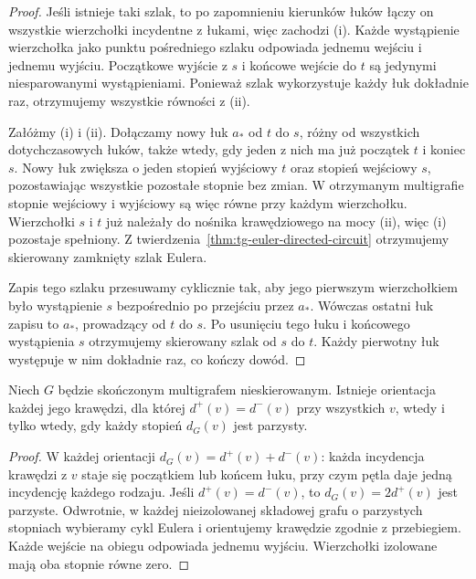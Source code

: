 \begin{proof}
Jeśli istnieje taki szlak, to po zapomnieniu kierunków
łuków łączy on wszystkie wierzchołki incydentne z łukami,
więc zachodzi (i). Każde wystąpienie wierzchołka jako
punktu pośredniego szlaku odpowiada jednemu wejściu
i jednemu wyjściu. Początkowe wyjście z $s$ i końcowe
wejście do $t$ są jedynymi niesparowanymi wystąpieniami.
Ponieważ szlak wykorzystuje każdy łuk dokładnie raz,
otrzymujemy wszystkie równości z (ii).

Załóżmy (i) i (ii). Dołączamy nowy łuk $a_*$ od $t$ do $s$,
różny od wszystkich dotychczasowych łuków, także wtedy,
gdy jeden z nich ma już początek $t$ i koniec $s$.
Nowy łuk zwiększa o jeden stopień wyjściowy $t$
oraz stopień wejściowy $s$, pozostawiając wszystkie
pozostałe stopnie bez zmian. W otrzymanym multigrafie
stopnie wejściowy i wyjściowy są więc równe przy każdym
wierzchołku. Wierzchołki $s$ i $t$ już należały do nośnika
krawędziowego na mocy (ii), więc (i) pozostaje spełniony.
Z twierdzenia~\ref{thm:tg-euler-directed-circuit}
otrzymujemy skierowany zamknięty szlak Eulera.

Zapis tego szlaku przesuwamy cyklicznie tak, aby jego
pierwszym wierzchołkiem było wystąpienie $s$ bezpośrednio
po przejściu przez $a_*$. Wówczas ostatni łuk zapisu
to $a_*$, prowadzący od $t$ do $s$. Po usunięciu tego
łuku i końcowego wystąpienia $s$ otrzymujemy skierowany
szlak od $s$ do $t$. Każdy pierwotny łuk występuje w nim
dokładnie raz, co kończy dowód.
\end{proof}

\begin{stwierdzenie}
Niech $G$ będzie skończonym multigrafem nieskierowanym.
Istnieje orientacja każdej jego krawędzi, dla której
$d^+(v)=d^-(v)$ przy wszystkich $v$, wtedy i tylko wtedy,
gdy każdy stopień $d_G(v)$ jest parzysty.
\end{stwierdzenie}

\begin{proof}
W każdej orientacji $d_G(v)=d^+(v)+d^-(v)$:
każda incydencja krawędzi z $v$ staje się początkiem
lub końcem łuku, przy czym pętla daje jedną incydencję
każdego rodzaju. Jeśli $d^+(v)=d^-(v)$, to
$d_G(v)=2d^+(v)$ jest parzyste.
Odwrotnie, w każdej nieizolowanej składowej grafu o
parzystych stopniach wybieramy cykl Eulera i orientujemy
krawędzie zgodnie z przebiegiem. Każde wejście na obiegu
odpowiada jednemu wyjściu. Wierzchołki izolowane mają
oba stopnie równe zero.
\end{proof}

